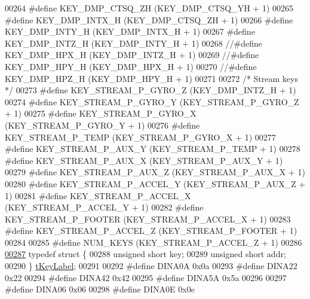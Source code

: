 \begin{DoxyCode}
00264 \textcolor{preprocessor}{#define KEY\_DMP\_CTSQ\_ZH             (KEY\_DMP\_CTSQ\_YH + 1)}
00265 \textcolor{preprocessor}{#define KEY\_DMP\_INTX\_H              (KEY\_DMP\_CTSQ\_ZH + 1)}
00266 \textcolor{preprocessor}{#define KEY\_DMP\_INTY\_H              (KEY\_DMP\_INTX\_H + 1)}
00267 \textcolor{preprocessor}{#define KEY\_DMP\_INTZ\_H              (KEY\_DMP\_INTY\_H + 1)}
00268 \textcolor{comment}{//#define KEY\_DMP\_HPX\_H               (KEY\_DMP\_INTZ\_H + 1)}
00269 \textcolor{comment}{//#define KEY\_DMP\_HPY\_H               (KEY\_DMP\_HPX\_H + 1)}
00270 \textcolor{comment}{//#define KEY\_DMP\_HPZ\_H               (KEY\_DMP\_HPY\_H + 1)}
00271 
00272 \textcolor{comment}{/* Stream keys */}
00273 \textcolor{preprocessor}{#define KEY\_STREAM\_P\_GYRO\_Z         (KEY\_DMP\_INTZ\_H + 1)}
00274 \textcolor{preprocessor}{#define KEY\_STREAM\_P\_GYRO\_Y         (KEY\_STREAM\_P\_GYRO\_Z + 1)}
00275 \textcolor{preprocessor}{#define KEY\_STREAM\_P\_GYRO\_X         (KEY\_STREAM\_P\_GYRO\_Y + 1)}
00276 \textcolor{preprocessor}{#define KEY\_STREAM\_P\_TEMP           (KEY\_STREAM\_P\_GYRO\_X + 1)}
00277 \textcolor{preprocessor}{#define KEY\_STREAM\_P\_AUX\_Y          (KEY\_STREAM\_P\_TEMP + 1)}
00278 \textcolor{preprocessor}{#define KEY\_STREAM\_P\_AUX\_X          (KEY\_STREAM\_P\_AUX\_Y + 1)}
00279 \textcolor{preprocessor}{#define KEY\_STREAM\_P\_AUX\_Z          (KEY\_STREAM\_P\_AUX\_X + 1)}
00280 \textcolor{preprocessor}{#define KEY\_STREAM\_P\_ACCEL\_Y        (KEY\_STREAM\_P\_AUX\_Z + 1)}
00281 \textcolor{preprocessor}{#define KEY\_STREAM\_P\_ACCEL\_X        (KEY\_STREAM\_P\_ACCEL\_Y + 1)}
00282 \textcolor{preprocessor}{#define KEY\_STREAM\_P\_FOOTER         (KEY\_STREAM\_P\_ACCEL\_X + 1)}
00283 \textcolor{preprocessor}{#define KEY\_STREAM\_P\_ACCEL\_Z        (KEY\_STREAM\_P\_FOOTER + 1)}
00284 
00285 \textcolor{preprocessor}{#define NUM\_KEYS                    (KEY\_STREAM\_P\_ACCEL\_Z + 1)}
00286 
\hypertarget{dmp_key_8h_source.tex_l00287}{}\hyperlink{structt_key_label}{00287} \textcolor{keyword}{typedef} \textcolor{keyword}{struct }\{
00288     \textcolor{keywordtype}{unsigned} \textcolor{keywordtype}{short} key;
00289     \textcolor{keywordtype}{unsigned} \textcolor{keywordtype}{short} addr;
00290 \} \hyperlink{structt_key_label}{tKeyLabel};
00291 
00292 \textcolor{preprocessor}{#define DINA0A 0x0a}
00293 \textcolor{preprocessor}{#define DINA22 0x22}
00294 \textcolor{preprocessor}{#define DINA42 0x42}
00295 \textcolor{preprocessor}{#define DINA5A 0x5a}
00296 
00297 \textcolor{preprocessor}{#define DINA06 0x06}
00298 \textcolor{preprocessor}{#define DINA0E 0x0e}

\end{DoxyCode}
